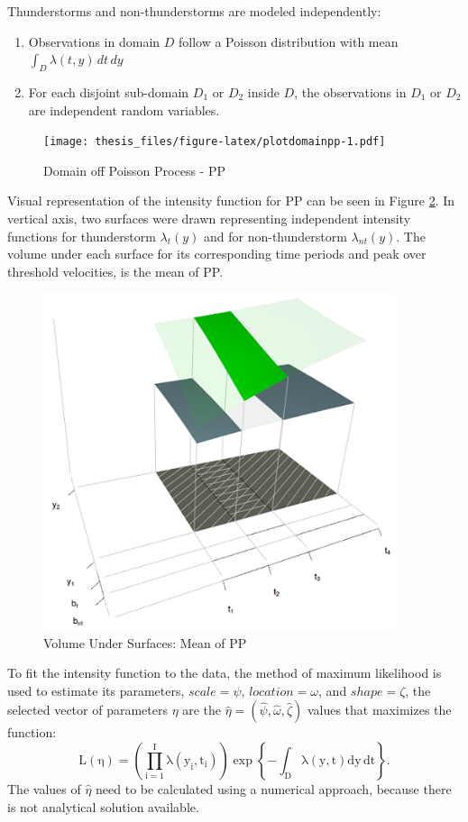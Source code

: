 \documentclass[12pt,twoside]{reedthesis}
\providecommand{\tightlist}{%
  \setlength{\itemsep}{0pt}\setlength{\parskip}{0pt}}
\begin{document}
Thunderstorms and non-thunderstorms are modeled independently:
\begin{enumerate}
\def\labelenumi{\arabic{enumi}.}
\tightlist
\item
  Observations in domain \(D\) follow a Poisson distribution with mean \(\int_D\lambda(t,y)\,dt\,dy\)
\item
  For each disjoint sub-domain \(D_1\) or \(D_2\) inside \(D\), the observations in \(D_1\) or \(D_2\) are independent random variables.
\end{enumerate}
\begin{figure}
\centering
\texttt{[image: thesis\_files/figure-latex/plotdomainpp-1.pdf]}
\caption{\label{fig:plotdomainpp}Domain off Poisson Process - PP}
\end{figure}
Visual representation of the intensity function for PP can be seen in Figure \ref{fig:plotdomain3dpp}. In vertical axis, two surfaces were drawn representing independent intensity functions for thunderstorm \(\lambda_t(y)\) and for non-thunderstorm \(\lambda_{nt}(y)\). The volume under each surface for its corresponding time periods and peak over threshold velocities, is the mean of PP.
\begin{figure}

{\centering \includegraphics[width=4.07in]{figure/domain3d} 

}

\caption{Volume Under Surfaces: Mean of PP}\label{fig:plotdomain3dpp}
\end{figure}
To fit the intensity function to the data, the method of maximum likelihood is used to estimate its parameters, \(scale = \psi\), \(location = \omega\), and \(shape = \zeta\), the selected vector of parameters \(\eta\) are the \(\hat\eta = (\hat\psi, \hat\omega, \hat\zeta)\) values that maximizes the function:
\begin{equation}
  \mathrm{
          L(\eta)=\left( 
                        \prod_{i=1}^I\lambda\left(y_i,t_i\right)  
                  \right)
                  \exp\left\{
                            -\int_{{D}}\lambda\left(y,t\right)dy\,dt
                     \right\}.
         }
  \label{eq:pplikelihood}
\end{equation}
The values of \(\hat\eta\) need to be calculated using a numerical approach, because there is not analytical solution available.
\end{document}
